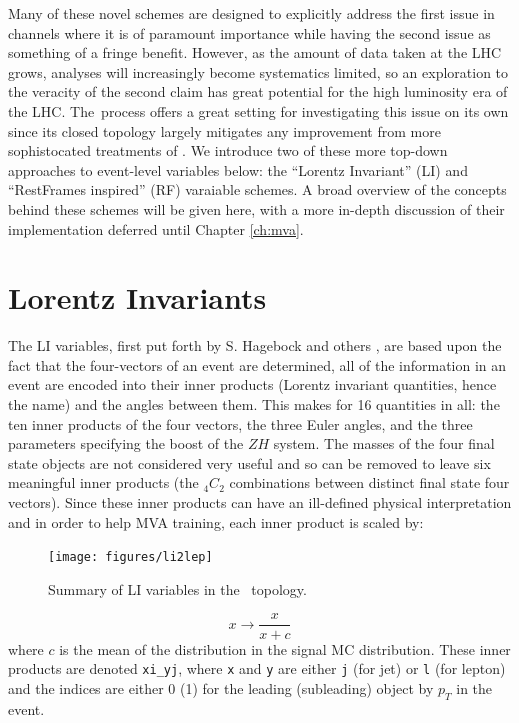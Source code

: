 Many of these novel schemes are designed to explicitly address the first issue in channels where it is of paramount importance while having the second issue as something of a fringe benefit.  However, as the amount of data taken at the LHC grows, analyses will increasingly become systematics limited, so an exploration to the veracity of the second claim has great potential for the high luminosity era of the LHC.  The \ZH\,process offers a great setting for investigating this issue on its own since its closed topology largely mitigates any improvement from more sophistocated treatments of \met.  We introduce two of these more top-down approaches to event-level variables below: the ``Lorentz Invariant'' (LI) \cite{litalk} and ``RestFrames inspired'' (RF) \cite{rjr} varaiable schemes.  A broad overview of the concepts behind these schemes will be given here, with a more in-depth discussion of their implementation deferred until Chapter \ref{ch:mva}.


\section{Lorentz Invariants}
  The LI variables, first put forth by S. Hagebock and others \cite{litalk}, are based upon the fact that the four-vectors of an event are determined, all of the information in an event are encoded into their inner products (Lorentz invariant quantities, hence the name) and the angles between them.  This makes for 16 quantities in all: the ten inner products of the four vectors, the three Euler angles, and the three parameters specifying the boost of the $ZH$ system.  The masses of the four final state objects are not considered very useful and so can be removed to leave six meaningful inner products (the $_4C_2$ combinations between distinct final state four vectors).  Since these inner products can have an ill-defined physical interpretation and in order to help MVA training, each inner product is scaled by:
\begin{figure}[!htbp]\captionsetup{justification=centering}
  \centering
  \texttt{[image: figures/li2lep]}
  \caption{Summary of LI variables in the \ZH\, topology.}
  \label{fig:rftree}
\end{figure}

\begin{equation}
\label{eqn:liip}
x\to\frac{x}{x+c}
\end{equation}
where $c$ is the mean of the distribution in the signal MC distribution.  These inner products are denoted \texttt{xi\_yj}, where \texttt{x} and \texttt{y} are either \texttt{j} (for jet) or \texttt{l} (for lepton) and the indices are either 0 (1) for the leading (subleading) object by $p_T$ in the event.

